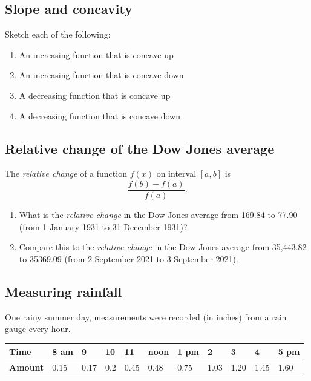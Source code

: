 \documentclass[
]{book}
\providecommand{\tightlist}{%
  \setlength{\itemsep}{0pt}\setlength{\parskip}{0pt}}
\begin{document}
\hypertarget{slope-and-concavity}{%
\subsection{Slope and concavity}\label{slope-and-concavity}}

Sketch each of the following:

\begin{enumerate}
\def\labelenumi{\arabic{enumi}.}
\tightlist
\item
  An increasing function that is concave up
\item
  An increasing function that is concave down
\item
  A decreasing function that is concave up
\item
  A decreasing function that is concave down
\end{enumerate}

\hypertarget{relative-change-of-the-dow-jones-average}{%
\subsection{Relative change of the Dow Jones average}\label{relative-change-of-the-dow-jones-average}}

The \emph{relative change} of a function \(f(x)\) on interval \([a,b]\) is
\[ \frac{f(b)-f(a)}{f(a)}.\]

\begin{enumerate}
\def\labelenumi{\arabic{enumi}.}
\tightlist
\item
  What is the \emph{relative change} in the Dow Jones average from 169.84 to 77.90 (from 1 January 1931 to 31 December 1931)?
\item
  Compare this to the \emph{relative change} in the Dow Jones average from 35,443.82 to 35369.09 (from 2 September 2021 to 3 September 2021).
\end{enumerate}

\hypertarget{measuring-rainfall}{%
\subsection{Measuring rainfall}\label{measuring-rainfall}}

One rainy summer day, measurements were recorded (in inches) from a rain gauge every hour.

\begin{longtable}[]{@{}lllllllllll@{}}
\toprule
\textbf{Time} & 8 am & 9 & 10 & 11 & noon & 1 pm & 2 & 3 & 4 & 5 pm\tabularnewline
\midrule
\endhead
\textbf{Amount} & 0.15 & 0.17 & 0.2 & 0.45 & 0.48 & 0.75 & 1.03 & 1.20 & 1.45 & 1.60\tabularnewline
\bottomrule
\end{longtable}
\end{document}
